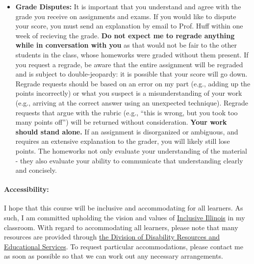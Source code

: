 \documentclass[11pt]{article}
\begin{document}
\begin{itemize}
\item[] \textbf{Grade Disputes:} It is important that you understand and agree
        with the grade you receive on assignments and exams. If you would like
        to dispute your score, you must send an explanation by email to Prof.
        Huff within one week of recieving the grade.
        \textbf{Do not expect me to regrade anything while in conversation with
        you} as that would not be fair to the other students in the class, whose
        homeworks were graded without them present.  If you request a regrade,
        be aware that the entire assignment will be regraded and is subject to
        double-jeopardy: it is possible that your score will go down.
        Regrade requests should be based on an error on my part (e.g., adding
        up the points incorrectly) or what you suspect is a misunderstanding of
        your work (e.g., arriving at the correct answer using an unexpected
        technique). Regrade requests that argue with the rubric (e.g., ``this is
        wrong, but you took too many points off'') will be returned without
        consideration.
        \textbf{Your work should stand alone.} If an assignment is disorganized or
        ambiguous, and requires an extensive explanation to the grader, you
        will likely still lose points. The homeworks not only evaluate your
        understanding of the material - they also evaluate your ability to
        communicate that understanding clearly and concisely.
\end{itemize}

\paragraph{Accessibility:} I hope that this course will be inclusive and
accommodating for all learners. As such, I am committed upholding the vision
and values of \href{http://www.inclusiveillinois.illinois.edu/index.html}{Inclusive Illinois}
in my
classroom.  With regard to accommodating all learners, please note that many
resources are provided through
\href{http://disability.illinois.edu/academic-support/accommodations}{the
Division of Disability Resources and Educational Services}.  To request
particular accommodations, please contact me as soon as possible so that we can
work out any necessary arrangements.
\end{document}
